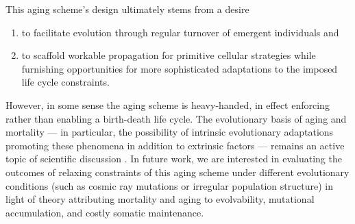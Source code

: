 This aging scheme's design ultimately stems from a desire
\begin{enumerate}
\item to facilitate evolution through regular turnover of emergent individuals and
\item to scaffold workable propagation for primitive cellular strategies while furnishing opportunities for more sophisticated adaptations to the imposed life cycle constraints.
\end{enumerate}
However, in some sense the aging scheme is heavy-handed, in effect enforcing rather than enabling a birth-death life cycle.
The evolutionary basis of aging and mortality --- in particular, the possibility of intrinsic evolutionary adaptations promoting these phenomena in addition to extrinsic factors  --- remains an active topic of scientific discussion \cite{baig2014evolution}.
In future work, we are interested in evaluating the outcomes of relaxing constraints of this aging scheme under different evolutionary conditions (such as cosmic ray mutations or irregular population structure) in light of theory attributing mortality and aging to evolvability, mutational accumulation, and costly somatic maintenance.

\
